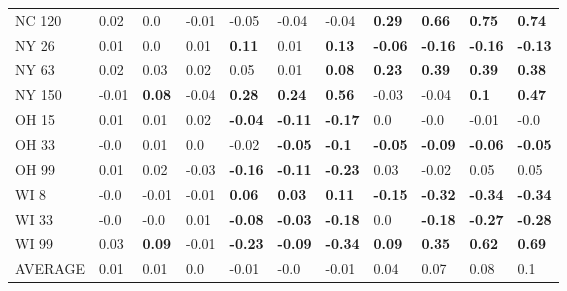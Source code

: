 \begin{tabular}{lllllllllll}
NC 120  &    0.02 &            0.0 &   -0.01 &           -0.05 &           -0.04 &           -0.04 &   \textbf{0.29} &   \textbf{0.66} &   \textbf{0.75} &   \textbf{0.74} \\
NY 26   &    0.01 &            0.0 &    0.01 &   \textbf{0.11} &            0.01 &   \textbf{0.13} &  \textbf{-0.06} &  \textbf{-0.16} &  \textbf{-0.16} &  \textbf{-0.13} \\
NY 63   &    0.02 &           0.03 &    0.02 &            0.05 &            0.01 &   \textbf{0.08} &   \textbf{0.23} &   \textbf{0.39} &   \textbf{0.39} &   \textbf{0.38} \\
NY 150  &   -0.01 &  \textbf{0.08} &   -0.04 &   \textbf{0.28} &   \textbf{0.24} &   \textbf{0.56} &           -0.03 &           -0.04 &    \textbf{0.1} &   \textbf{0.47} \\
OH 15   &    0.01 &           0.01 &    0.02 &  \textbf{-0.04} &  \textbf{-0.11} &  \textbf{-0.17} &             0.0 &            -0.0 &           -0.01 &            -0.0 \\
OH 33   &    -0.0 &           0.01 &     0.0 &           -0.02 &  \textbf{-0.05} &   \textbf{-0.1} &  \textbf{-0.05} &  \textbf{-0.09} &  \textbf{-0.06} &  \textbf{-0.05} \\
OH 99   &    0.01 &           0.02 &   -0.03 &  \textbf{-0.16} &  \textbf{-0.11} &  \textbf{-0.23} &            0.03 &           -0.02 &            0.05 &            0.05 \\
WI 8    &    -0.0 &          -0.01 &   -0.01 &   \textbf{0.06} &   \textbf{0.03} &   \textbf{0.11} &  \textbf{-0.15} &  \textbf{-0.32} &  \textbf{-0.34} &  \textbf{-0.34} \\
WI 33   &    -0.0 &           -0.0 &    0.01 &  \textbf{-0.08} &  \textbf{-0.03} &  \textbf{-0.18} &             0.0 &  \textbf{-0.18} &  \textbf{-0.27} &  \textbf{-0.28} \\
WI 99   &    0.03 &  \textbf{0.09} &   -0.01 &  \textbf{-0.23} &  \textbf{-0.09} &  \textbf{-0.34} &   \textbf{0.09} &   \textbf{0.35} &   \textbf{0.62} &   \textbf{0.69} \\
AVERAGE &    0.01 &           0.01 &     0.0 &           -0.01 &            -0.0 &           -0.01 &            0.04 &            0.07 &            0.08 &             0.1 \\
\bottomrule
\end{tabular}
